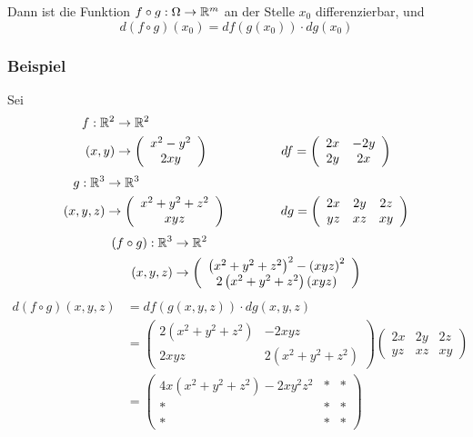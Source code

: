 Dann ist die Funktion $f\circ g:\Omega\to\mathbb{R}^m$ an der Stelle $x_0$ differenzierbar, und
\[d\left( f\circ g\right)\left( x_0\right)=df\left( g\left( x_0\right)\right)\cdot dg\left( x_0\right)\]

\subsubsection*{Beispiel}
Sei
\begin{align*}
f:\R^2 & \to\R^2\\
\left( x,y\right) & \to\left( {\begin{array}{*{20}{c}}
{{x^2} - {y^2}}\\
{2xy}
\end{array}} \right) \hspace{20mm}df = \left( {\begin{array}{*{20}{c}}
{2x}&{ - 2y}\\
{2y}&{2x}
\end{array}} \right)
\end{align*}
\begin{align*}
g:\R^3 & \to\R^3\\
\left( x,y,z\right) & \to\left( {\begin{array}{*{20}{c}}
{{x^2} +{y^2}+{z^2}}\\
{xyz}
\end{array}} \right) \hspace{15mm}dg = \left( {\begin{array}{*{20}{c}}
{2x}&{2y}&{2z}\\
{yz}&{xz}&{xy}
\end{array}} \right)
\end{align*}
\begin{align*}
\left( f\circ g\right):\R^3 & \to\R^2\\
\left(x,y,z\right)&\to \left( {\begin{array}{*{20}{c}}
{{{\left( {{x^2} + {y^2} + {z^2}} \right)}^2} - {{\left( {xyz} \right)}^2}}\\
{2\left( {{x^2} + {y^2} + {z^2}} \right)\left( {xyz} \right)}
\end{array}} \right)
\end{align*}
\begin{align*}
d\left( {f \circ g} \right)\left( {x,y,z} \right)&= df\left( {g\left( {x,y,z} \right)} \right) \cdot dg\left( {x,y,z} \right)\\
&= \left( {\begin{array}{*{20}{c}}
{2\left( {{x^2} + {y^2} + {z^2}} \right)}&{ - 2xyz}\\
{2xyz}&{2\left( {{x^2} + {y^2} + {z^2}} \right)}
\end{array}} \right)\left( {\begin{array}{*{20}{c}}
{2x}&{2y}&{2z}\\
{yz}&{xz}&{xy}
\end{array}} \right)\\
&=\left( {\begin{array}{*{20}{c}}
{4x\left( {{x^2} + {y^2} + {z^2}} \right) - 2x{y^2}{z^2}}& * & * \\
 * & * & * \\
 * & * & *
\end{array}} \right)
\end{align*}
